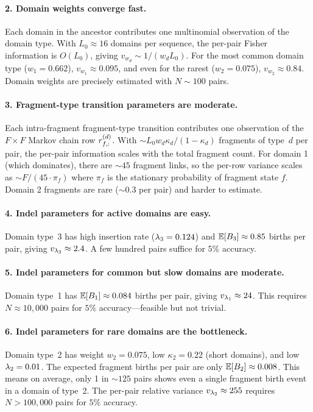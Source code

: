 \paragraph{2. Domain weights converge fast.}
Each domain in the ancestor contributes one multinomial observation
of the domain type.
With $L_0 \approx 16$ domains per sequence, the per-pair
Fisher information is $O(L_0)$, giving $v_{w_d} \sim 1/(w_d L_0)$.
For the most common domain type ($w_1 = 0.662$), $v_{w_1} \approx 0.095$,
and even for the rarest ($w_2 = 0.075$), $v_{w_2} \approx 0.84$.
Domain weights are precisely estimated with $N \sim 100$ pairs.

\paragraph{3. Fragment-type transition parameters are moderate.}
Each intra-fragment fragment-type transition contributes one observation
of the $F \times F$ Markov chain row $r^{(d)}_{f,:}$.
With $\sim L_0 w_d \kappa_d/(1-\kappa_d)$ fragments of type~$d$ per pair,
the per-pair information scales with the total fragment count.
For domain 1 (which dominates), there are $\sim 45$ fragment links,
so the per-row variance scales as $\sim F/(45 \cdot \pi_f)$ where
$\pi_f$ is the stationary probability of fragment state $f$.
Domain 2 fragments are rare ($\sim 0.3$ per pair) and harder to estimate.

\paragraph{4. Indel parameters for active domains are easy.}
Domain type~3 has high insertion rate ($\lambda_3 = 0.124$)
and $\mathbb{E}[B_3] \approx 0.85$ births per pair,
giving $v_{\lambda_3} \approx 2.4$.
A few hundred pairs suffice for $5\%$ accuracy.

\paragraph{5. Indel parameters for common but slow domains are moderate.}
Domain type~1 has $\mathbb{E}[B_1] \approx 0.084$ births per pair,
giving $v_{\lambda_1} \approx 24$.
This requires $N \approx 10{,}000$ pairs for $5\%$ accuracy---feasible
but not trivial.

\paragraph{6. Indel parameters for rare domains are the bottleneck.}
Domain type~2 has weight $w_2 = 0.075$, low $\kappa_2 = 0.22$
(short domains), and low $\lambda_2 = 0.01$.
The expected fragment births per pair are only $\mathbb{E}[B_2] \approx 0.008$.
This means on average, only 1 in $\sim 125$ pairs shows even a single
fragment birth event in a domain of type~2.
The per-pair relative variance $v_{\lambda_2} \approx 255$ requires
$N > 100{,}000$ pairs for $5\%$ accuracy.

